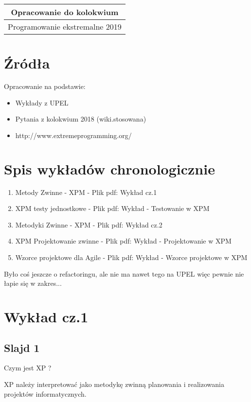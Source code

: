 \documentclass[a4paper,15pt]{article}
\begin{document}
\begin{table}
\begin{center}
\begin{tabular}{|c|c|c|}
\hline
\multicolumn{3}{|c|}{\textbf{Opracowanie do kolokwium}} \\ \hline \multicolumn{3}{|c|}{Programowanie ekstremalne 2019}  \\ \hline
\end{tabular}
\end{center}
\end{table}

\tableofcontents


\newpage
\section{Źródła}
Opracowanie na podstawie:
\begin{itemize}
\item Wykłady z UPEL
\item Pytania z kolokwium 2018 (wiki.stosowana)
\item http://www.extremeprogramming.org/
\end{itemize}

\section{Spis wykładów chronologicznie}
\begin{enumerate}
\item Metody Zwinne - XPM - Plik pdf: Wykład cz.1
\item XPM testy jednostkowe - Plik pdf: Wykład - Testowanie w XPM
\item Metodyki Zwinne - XPM - Plik pdf: Wykład cz.2
\item XPM Projektowanie zwinne - Plik pdf: Wykład - Projektowanie w XPM
\item Wzorce projektowe dla Agile - Plik pdf: Wykład - Wzorce projektowe w XPM
\end{enumerate}
Było coś jeszcze o refactoringu, ale nie ma nawet tego na UPEL więc pewnie nie łapie się w zakres...

\section{Wykład cz.1}
\subsection{Slajd 1}
\begin{framed}
Czym jest XP ?
\end{framed}
XP należy interpretować jako metodykę zwinną planowania i realizowania projektów informatycznych. 
\end{document}
